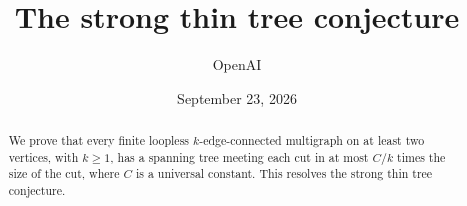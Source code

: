 \documentclass[11pt]{amsart}
\title{The strong thin tree conjecture}
\author{OpenAI}
\date{September 23, 2026}
\theoremstyle{definition}
\theoremstyle{remark}
\numberwithin{equation}{section}
\begin{document}
\begin{abstract}
We prove that every finite loopless \(k\)-edge-connected multigraph on
at least two vertices, with \(k\ge1\), has a spanning tree meeting each
cut in at most \(C/k\) times the size of the cut,
where \(C\) is a universal constant.
This resolves the strong thin tree conjecture.
\end{abstract}
\maketitle
\setcounter{tocdepth}{1}
\tableofcontents






\appendix





\end{document}
